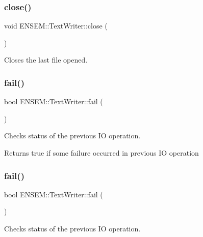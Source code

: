 \subsubsection{\texorpdfstring{close()}{close()}\hspace{0.1cm}{\footnotesize\ttfamily [2/2]}}
{\footnotesize\ttfamily void E\+N\+S\+E\+M\+::\+Text\+Writer\+::close (\begin{DoxyParamCaption}{ }\end{DoxyParamCaption})}



Closes the last file opened. 

\mbox{\label{classENSEM_1_1TextWriter_a924bbfa5f3bd8f1dbb3f856b1db8b9be}} 
\subsubsection{\texorpdfstring{fail()}{fail()}\hspace{0.1cm}{\footnotesize\ttfamily [1/2]}}
{\footnotesize\ttfamily bool E\+N\+S\+E\+M\+::\+Text\+Writer\+::fail (\begin{DoxyParamCaption}{ }\end{DoxyParamCaption})}



Checks status of the previous IO operation. 

\begin{DoxyReturn}{Returns}
true if some failure occurred in previous IO operation 
\end{DoxyReturn}
\mbox{\label{classENSEM_1_1TextWriter_a924bbfa5f3bd8f1dbb3f856b1db8b9be}} 
\subsubsection{\texorpdfstring{fail()}{fail()}\hspace{0.1cm}{\footnotesize\ttfamily [2/2]}}
{\footnotesize\ttfamily bool E\+N\+S\+E\+M\+::\+Text\+Writer\+::fail (\begin{DoxyParamCaption}{ }\end{DoxyParamCaption})}



Checks status of the previous IO operation. 

